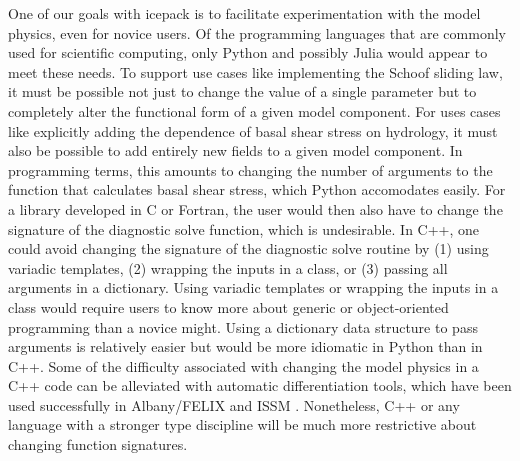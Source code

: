 \documentclass[journal abbreviation, manuscript]{copernicus}
\begin{document}
One of our goals with icepack is to facilitate experimentation with the model physics, even for novice users.
Of the programming languages that are commonly used for scientific computing, only Python and possibly Julia would appear to meet these needs.
To support use cases like implementing the Schoof sliding law, it must be possible not just to change the value of a single parameter but to completely alter the functional form of a given model component.
For uses cases like explicitly adding the dependence of basal shear stress on hydrology, it must also be possible to add entirely new fields to a given model component.
In programming terms, this amounts to changing the number of arguments to the function that calculates basal shear stress, which Python accomodates easily.
For a library developed in C or Fortran, the user would then also have to change the signature of the diagnostic solve function, which is undesirable.
In C++, one could avoid changing the signature of the diagnostic solve routine by (1) using variadic templates, (2) wrapping the inputs in a class, or (3) passing all arguments in a dictionary.
Using variadic templates or wrapping the inputs in a class would require users to know more about generic or object-oriented programming than a novice might.
Using a dictionary data structure to pass arguments is relatively easier but would be more idiomatic in Python than in C++.
Some of the difficulty associated with changing the model physics in a C++ code can be alleviated with automatic differentiation tools, which have been used successfully in Albany/FELIX \citep{tezaur2015albany} and ISSM \citep{huck2018usability}.
Nonetheless, C++ or any language with a stronger type discipline will be much more restrictive about changing function signatures.
\end{document}

